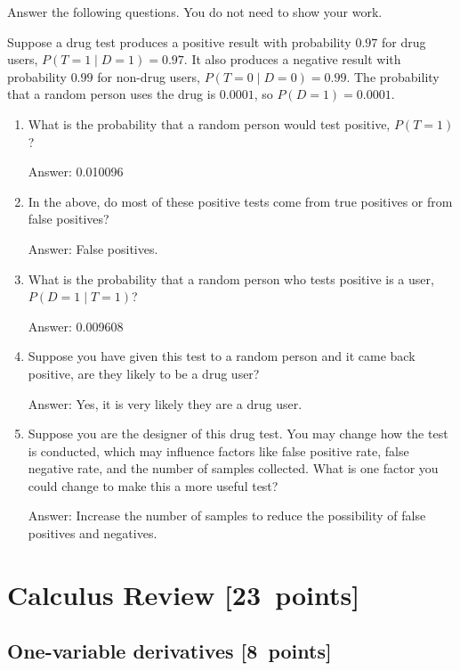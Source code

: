 \documentclass{article}
\newcommand{\blu}[1]{{\textcolor{blu}{#1}}}
\newenvironment{answer}{\par\begingroup\color{gre}Answer: }{\endgroup}
\let\ask\blu
\newcommand\pts[1]{\textcolor{pointscolour}{[#1~points]}}
\begin{document}
  \ask{Answer the following questions.} You do not need to show your work.

  Suppose a drug test produces a positive result with probability $0.97$ for drug users, $P(T=1 \mid D=1)=0.97$. It also produces a negative result with probability $0.99$ for non-drug users, $P(T=0 \mid D=0)=0.99$. The probability that a random person uses the drug is $0.0001$, so $P(D=1)=0.0001$.

  \begin{enumerate}
  \item What is the probability that a random person would test positive, $P(T=1)$?
  \begin{answer}
  0.010096
  \end{answer}
  \item In the above, do most of these positive tests come from true positives or from false positives?
  \begin{answer}
  False positives.
  \end{answer}
  \item What is the probability that a random person who tests positive is a user, $P(D=1 \mid T=1)$?
  \begin{answer}
  0.009608
  \end{answer}
  \item Suppose you have given this test to a random person and it came back positive, are they likely to be a drug user?
  \begin{answer}
  Yes, it is very likely they are a drug user.
  \end{answer}
  \item Suppose you are the designer of this drug test. You may change how the test is conducted, which may influence factors like false positive rate, false negative rate, and the number of samples collected. What is one factor you could change to make this a more useful test?
  \begin{answer}
  Increase the number of samples to reduce the possibility of false positives and negatives.
  \end{answer}
  \end{enumerate}


  \clearpage\section{Calculus Review \pts{23}}



  \subsection{One-variable derivatives \pts{8}}
  \label{sub.one.var}
\end{document}
